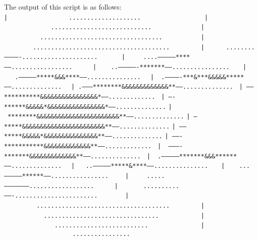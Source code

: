 {The output of this script is as follows: \\

{\tt |~~~~~~~~~~~~~~~~~....................~~~~~~~~~~~~~~~~~}\newline
{\tt |~~~~~~~~~~~~~............................~~~~~~~~~~~~~}\newline
{\tt |~~~~~~~~~~..................................~~~~~~~~~~}\newline
{\tt |~~~~~~~~......................................~~~~~~~~}\newline
{\tt |~~~~~~........-------------.....................~~~~~~}\newline
{\tt |~~~~~....--------------****-----.................~~~~~}\newline
{\tt |~~~~..----------------*******------................~~~}\newline
{\tt |~~~.---------------*****\&\&\&****------...............~~}\newline
{\tt |~~.-------------***\&***\&\&\&\&\&*****-----..............~~}\newline
{\tt |~.---------********\&\&\&\&\&\&\&\&\&\&\&\&\&**-----..............~}\newline
{\tt |~------**********\&\&\&\&\&\&\&\&\&\&\&\&\&\&\&\&*------.............~}\newline
{\tt |~----******\&\&\&\&\&*\&\&\&\&\&\&\&\&\&\&\&\&\&\&\&\&*------..............}\newline
{\tt |~********\&\&\&\&\&\&\&\&\&\&\&\&\&\&\&\&\&\&\&\&\&\&\&**------..............}\newline
{\tt |~---*****\&\&\&\&\&\&\&\&\&\&\&\&\&\&\&\&\&\&\&\&\&\&\&**------..............}\newline
{\tt |~-----*****\&\&\&\&\&*\&\&\&\&\&\&\&\&\&\&\&\&\&\&\&**------..............}\newline
{\tt |~-------***********\&\&\&\&\&\&\&\&\&\&\&\&\&**------.............~}\newline
{\tt |~~----------*******\&\&\&\&\&\&\&\&\&\&\&\&\&**-----..............~}\newline
{\tt |~~.--------------*******\&\&\&******-----..............~~}\newline
{\tt |~~~..---------------*****\&****------...............~~~}\newline
{\tt |~~~~...---------------******------................~~~~}\newline
{\tt |~~~~~.....---------------------..................~~~~~}\newline
{\tt |~~~~~~~..........-------.......................~~~~~~~}\newline
{\tt |~~~~~~~~~.....................................~~~~~~~~}\newline
{\tt |~~~~~~~~~~~................................~~~~~~~~~~~}\newline
{\tt |~~~~~~~~~~~~~~..........................~~~~~~~~~~~~~~}\newline
{\tt |~~~~~~~~~~~~~~~~~~~................~~~~~~~~~~~~~~~~~~~}\\
}


